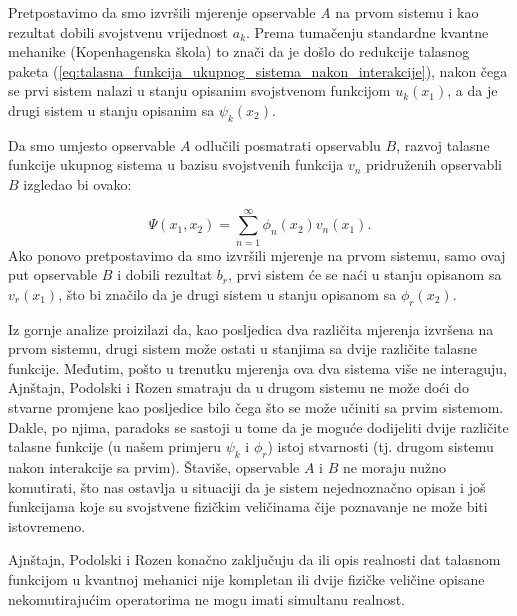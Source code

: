 Pretpostavimo da smo izvršili mjerenje opservable {\it{A}} na prvom sistemu i kao rezultat dobili svojstvenu vrijednost $a_k$.
Prema tumačenju standardne kvantne mehanike (Kopenhagenska škola) to znači da je došlo do redukcije talasnog paketa (\ref{eq:talasna_funkcija_ukupnog_sistema_nakon_interakcije}), nakon čega se prvi sistem nalazi u stanju opisanim svojstvenom funkcijom $u_k(x_1)$, a  da je drugi sistem u stanju opisanim sa $\psi_k(x_2)$.

Da smo umjesto opservable $A$ odlučili posmatrati opservablu $B$, razvoj talasne funkcije ukupnog sistema u bazisu svojstvenih funkcija $v_n$ pridruženih opservabli $B$ izgledao bi ovako:

\begin{equation}
    \Psi(x_1, x_2) = \sum_{n=1}^{\infty} \phi_n(x_2)v_n(x_1).
\end{equation}
Ako ponovo pretpostavimo da smo izvršili mjerenje na prvom sistemu, samo ovaj put opservable $B$ i dobili rezultat $b_r$, prvi sistem će se naći u stanju opisanom sa $v_r(x_1)$, što bi značilo da je drugi sistem u stanju opisanom sa $\phi_r(x_2)$.

Iz gornje analize proizilazi da, kao posljedica dva različita mjerenja izvršena na prvom sistemu,
drugi sistem može ostati u stanjima sa dvije različite talasne funkcije.
Međutim, pošto u trenutku mjerenja ova dva sistema više ne interaguju, Ajnštajn, Podolski i Rozen smatraju da u drugom sistemu ne može doći do stvarne promjene kao posljedice
bilo čega što se može učiniti sa prvim sistemom.
Dakle, po njima, paradoks se sastoji u tome da je moguće dodijeliti dvije različite talasne funkcije (u našem primjeru $\psi_k$ i $\phi_r$) istoj stvarnosti (tj. drugom sistemu nakon interakcije sa prvim).
Štaviše, opservable $A$ i $B$ ne moraju nužno komutirati, što nas ostavlja u situaciji da je sistem nejednoznačno opisan i još funkcijama koje su svojstvene fizičkim veličinama čije poznavanje ne može biti istovremeno.


Ajnštajn, Podolski i Rozen konačno zaključuju da ili opis realnosti dat talasnom funkcijom u kvantnoj mehanici nije kompletan
ili dvije fizičke veličine opisane nekomutirajućim operatorima ne mogu imati simultanu realnost.

